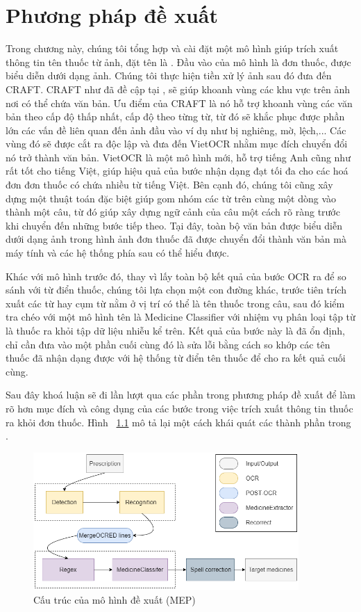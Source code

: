 \chapter{Phương pháp đề xuất}
\label{Chapter3}

Trong chương này, chúng tôi tổng hợp và cài đặt một mô hình giúp trích xuất thông tin tên thuốc từ ảnh, đặt tên là . Đầu vào của mô hình là đơn thuốc, được biểu diễn dưới dạng ảnh. Chúng tôi thực hiện tiền xử lý ảnh sau đó đưa đến CRAFT. CRAFT như đã đề cập tại \cite{baek2019character}, sẽ giúp khoanh vùng các khu vực trên ảnh nơi có thể chứa văn bản. Ưu điểm của CRAFT là nó hỗ trợ khoanh vùng các văn bản theo cấp độ thấp nhất, cấp độ theo từng từ, từ đó sẽ khắc phục được phần lớn các vấn đề liên quan đến ảnh đầu vào ví dụ như bị nghiêng, mờ, lệch,... Các vùng đó sẽ được cắt ra độc lập và đưa đến VietOCR \cite{VietOCR} nhằm mục đích chuyển đổi nó trở thành văn bản. VietOCR là một mô hình mới, hỗ trợ tiếng Anh cũng như rất tốt cho tiếng Việt, giúp hiệu quả của bước nhận dạng đạt tối đa cho các hoá đơn đơn thuốc có chứa nhiều từ tiếng Việt. Bên cạnh đó, chúng tôi cũng xây dựng một thuật toán đặc biệt giúp gom nhóm các từ trên cùng một dòng vào thành một câu, từ đó giúp xây dựng ngữ cảnh của câu một cách rõ ràng trước khi chuyển đến những bước tiếp theo. Tại đây, toàn bộ văn bản được biểu diễn dưới dạng ảnh trong hình ảnh đơn thuốc đã được chuyển đổi thành văn bản mà máy tính và các hệ thống phía sau có thể hiểu được.

Khác với mô hình trước đó, thay vì lấy toàn bộ kết quả của bước OCR ra để so sánh với từ điển thuốc, chúng tôi lựa chọn một con đường khác, trước tiên trích xuất các từ hay cụm từ nằm ở vị trí có thể là tên thuốc trong câu, sau đó kiểm tra chéo với một mô hình tên là Medicine Classifier với nhiệm vụ phân loại tập từ là thuốc ra khỏi tập dữ liệu nhiễu kể trên. Kết quả của bước này là đã ổn định, chỉ cần đưa vào một phần cuối cùng đó là sửa lỗi bằng cách so khớp các tên thuốc đã nhận dạng được với hệ thống từ điển tên thuốc để cho ra kết quả cuối cùng.

Sau đây khoá luận sẽ đi lần lượt qua các phần trong phương pháp đề xuất để làm rõ hơn mục đích và công dụng của các bước trong việc trích xuất thông tin thuốc ra khỏi đơn thuốc. Hình ~\ref{fig_proposed} mô tả lại một cách khái quát các thành phần trong .

\begin{figure}
\centering
\includegraphics[width=0.9\textwidth]{mep_img/proposed_method.png}
\caption{Cấu trúc của mô hình đề xuất (MEP)}\label{fig_proposed}
\end{figure}

